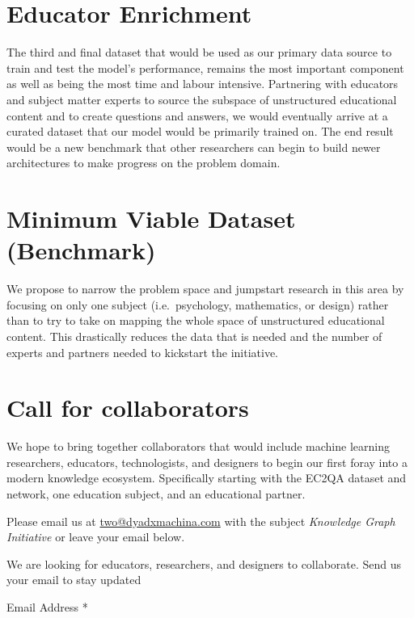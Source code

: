 \documentclass[]{book}
\theoremstyle{definition}
\theoremstyle{definition}
\theoremstyle{definition}
\theoremstyle{remark}
\begin{document}
\section{Educator Enrichment}\label{educator-enrichment}

The third and final dataset that would be used as our primary data
source to train and test the model's performance, remains the most
important component as well as being the most time and labour intensive.
Partnering with educators and subject matter experts to source the
subspace of unstructured educational content and to create questions and
answers, we would eventually arrive at a curated dataset that our model
would be primarily trained on. The end result would be a new benchmark
that other researchers can begin to build newer architectures to make
progress on the problem domain.

\section{Minimum Viable Dataset
(Benchmark)}\label{minimum-viable-dataset-benchmark}

We propose to narrow the problem space and jumpstart research in this
area by focusing on only one subject (i.e.~psychology, mathematics, or
design) rather than to try to take on mapping the whole space of
unstructured educational content. This drastically reduces the data that
is needed and the number of experts and partners needed to kickstart the
initiative.

\section{Call for collaborators}\label{call-for-collaborators}

We hope to bring together collaborators that would include machine
learning researchers, educators, technologists, and designers to begin
our first foray into a modern knowledge ecosystem. Specifically starting
with the EC2QA dataset and network, one education subject, and an
educational partner.

Please email us at \url{two@dyadxmachina.com} with the subject
\emph{Knowledge Graph Initiative} or leave your email below.

\hypertarget{mc_embed_signup}{}
\hypertarget{mc_embed_signup_scroll}{}
We are looking for educators, researchers, and designers to collaborate.
Send us your email to stay updated

Email Address *
\end{document}
